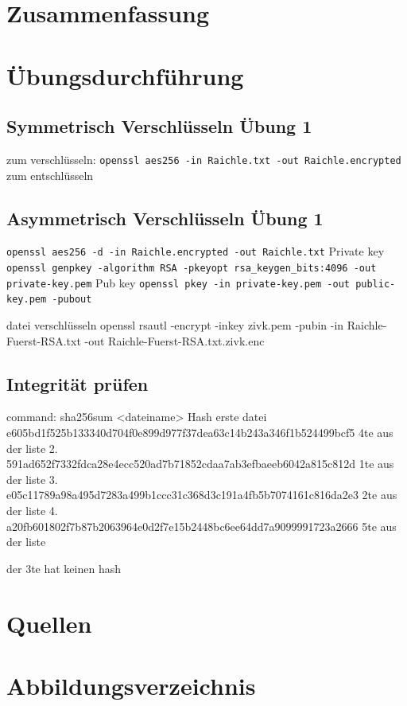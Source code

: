 \documentclass[a4paper]{article}
\begin{document}
\section{Zusammenfassung}


\newpage

\section{Übungsdurchführung}

\subsection{Symmetrisch Verschlüsseln Übung 1}
zum verschlüsseln:
\texttt{openssl aes256 -in Raichle.txt -out Raichle.encrypted}
zum entschlüsseln

\subsection{Asymmetrisch Verschlüsseln Übung 1}
\texttt{openssl aes256 -d -in Raichle.encrypted -out Raichle.txt}
Private key
\texttt{openssl genpkey -algorithm RSA -pkeyopt rsa_keygen_bits:4096 -out private-key.pem}
Pub key
\texttt{openssl pkey -in private-key.pem -out public-key.pem -pubout}

datei verschlüsseln
openssl rsautl -encrypt -inkey zivk.pem -pubin -in Raichle-Fuerst-RSA.txt -out Raichle-Fuerst-RSA.txt.zivk.enc
\subsection{Integrität prüfen}
command:
sha256sum <dateiname>
Hash erste datei
e605bd1f525b133340d704f0e899d977f37dea63c14b243a346f1b524499bcf5
4te aus der liste
2.
591ad652f7332fdca28e4ecc520ad7b71852cdaa7ab3efbaeeb6042a815c812d
1te aus der liste
3.
e05c11789a98a495d7283a499b1ccc31c368d3c191a4fb5b7074161c816da2e3
2te aus der liste
4.
a20fb601802f7b87b2063964e0d2f7e15b2448bc6ee64dd7a9099991723a2666
5te aus der liste

der 3te hat keinen hash



\newpage
\section{Quellen}

\newpage
\section{Abbildungsverzeichnis}

\listoffigures
\end{document}
